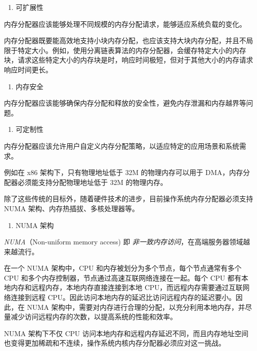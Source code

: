 \documentclass[AutoFakeBold]{LZUThesis}
\newcommand{\tightlist}{%
  \setlength{\itemsep}{0pt}\setlength{\parskip}{0pt}}
\begin{document}
\begin{sloppypar}
\begin{enumerate}
\def\labelenumi{\arabic{enumi}.}
\setcounter{enumi}{2}
\tightlist
\item
  可扩展性
\end{enumerate}

内存分配器应该能够处理不同规模的内存分配请求，能够适应系统负载的变化。

内存分配器既要能高效地支持小块内存分配，也应该支持大块内存分配，并且不局限于特定大小。例如，使用分离链表算法的内存分配器，会缓存特定大小的内存块，请求这些特定大小的内存块是时，响应时间极短，但对于其他大小的内存请求响应时间更长。

\begin{enumerate}
\def\labelenumi{\arabic{enumi}.}
\setcounter{enumi}{3}
\tightlist
\item
  内存安全
\end{enumerate}

内存分配器应该能够确保内存分配和释放的安全性，避免内存泄漏和内存越界等问题。

\begin{enumerate}
\def\labelenumi{\arabic{enumi}.}
\setcounter{enumi}{4}
\tightlist
\item
  可定制性
\end{enumerate}

内存分配器应该允许用户自定义内存分配策略，以适应特定的应用场景和系统需求。

例如在 x86 架构下，只有物理地址低于 32M 的物理内存可以用于
DMA，内存分配器必须能支持分配物理地址低于 32M 的物理内存。

除了这些传统的目标外，随着硬件技术的进步，目前操作系统内存分配器必须支持
NUMA 架构、内存热插拔、多核处理器等。

\begin{enumerate}
\def\labelenumi{\arabic{enumi}.}
\tightlist
\item
  NUMA 架构
\end{enumerate}

\emph{NUMA}（Non-uniform memory access) 即
\emph{非一致内存访问}，在高端服务器领域越来越流行。

在一个 NUMA 架构中，CPU 和内存被划分为多个节点，每个节点通常有多个 CPU
和多个内存控制器，节点通过高速互联网络连接在一起。每个 CPU
都有本地内存和远程内存，本地内存直接连接到本地
CPU，而远程内存需要通过互联网络连接到远程
CPU。因此访问本地内存的延迟比访问远程内存的延迟要小。因此，在 NUMA
架构中，需要对内存进行合理的分配，以充分利用本地内存，并尽量减少访问远程内存的次数，以提高系统的性能和效率。

NUMA 架构下不仅 CPU
访问本地内存和远程内存延迟不同，而且内存地址空间也变得更加稀疏和不连续，操作系统内核内存分配器必须应对这一挑战。


\end{sloppypar}
\end{document}

